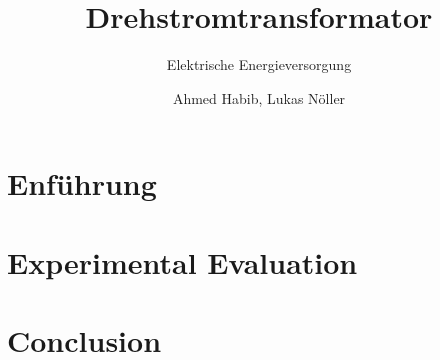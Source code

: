 \documentclass[sigconf]{acmart}
\begin{document}
\title{Drehstromtransformator}
\subtitle{Elektrische Energieversorgung}

\author{Ahmed Habib, Lukas Nöller}




\maketitle


\section{Enführung}



\section{Experimental Evaluation}
\label{sec:evaluation}


\section{Conclusion}
\label {sec:conclusion}

\end{document}
